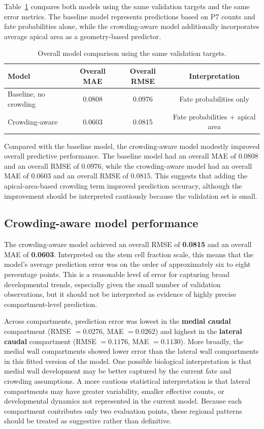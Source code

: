 \documentclass[12pt]{article}
\begin{document}
Table~\ref{tab:model_comparison} compares both models using the same validation targets and the same error metrics. The baseline model represents predictions based on P7 counts and fate probabilities alone, while the crowding-aware model additionally incorporates average apical area as a geometry-based predictor.

\begin{table}[H]
\centering
\caption{Overall model comparison using the same validation targets.}
\label{tab:model_comparison}
\begin{tabular}{lccc}
\toprule
Model & Overall MAE & Overall RMSE & Interpretation \\
\midrule
Baseline, no crowding & 0.0808 & 0.0976 & Fate probabilities only \\
Crowding-aware & 0.0603 & 0.0815 & Fate probabilities + apical area \\
\bottomrule
\end{tabular}
\end{table}

Compared with the baseline model, the crowding-aware model modestly improved overall predictive performance. The baseline model had an overall MAE of 0.0808 and an overall RMSE of 0.0976, while the crowding-aware model had an overall MAE of 0.0603 and an overall RMSE of 0.0815. This suggests that adding the apical-area-based crowding term improved prediction accuracy, although the improvement should be interpreted cautiously because the validation set is small.

\subsection{Crowding-aware model performance}

The crowding-aware model achieved an overall RMSE of \textbf{0.0815} and an overall MAE of \textbf{0.0603}. Interpreted on the stem cell fraction scale, this means that the model's average prediction error was on the order of approximately six to eight percentage points. This is a reasonable level of error for capturing broad developmental trends, especially given the small number of validation observations, but it should not be interpreted as evidence of highly precise compartment-level prediction.

Across compartments, prediction error was lowest in the \textbf{medial caudal} compartment (RMSE $= 0.0276$, MAE $= 0.0262$) and highest in the \textbf{lateral caudal} compartment (RMSE $= 0.1176$, MAE $= 0.1130$). More broadly, the medial wall compartments showed lower error than the lateral wall compartments in this fitted version of the model. One possible biological interpretation is that medial wall development may be better captured by the current fate and crowding assumptions. A more cautious statistical interpretation is that lateral compartments may have greater variability, smaller effective counts, or developmental dynamics not represented in the current model. Because each compartment contributes only two evaluation points, these regional patterns should be treated as suggestive rather than definitive.
\end{document}
